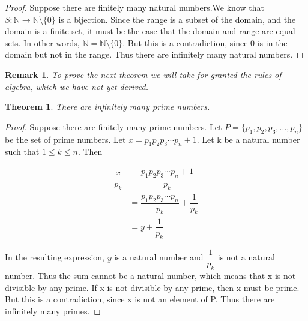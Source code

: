 \documentclass{article}
\newtheorem{theorem}{Theorem}
\newtheorem{remark}{Remark}
\begin{document}
\begin{proof}
Suppose there are finitely many natural numbers.We know that $S : \mathbb{N} \to \mathbb{N}\setminus\{0\}$ is a bijection. Since the range is a subset of the domain, and the domain is a finite set, it must be the case that the domain and range are equal sets. In other words, $\mathbb{N} = \mathbb{N}\setminus\{0\}$. But this is a contradiction, since 0 is in the domain but not in the range. Thus there are infinitely many natural numbers. 
\end{proof}

\begin{remark}
To prove the next theorem we will take for granted the rules of algebra, which we have not yet derived.
\end{remark}

\begin{theorem}
There are infinitely many prime numbers.
\end{theorem}

\begin{proof}
Suppose there are finitely many prime numbers. Let $P = \{p_{1}, p_{2}, p_{3}, ... ,p_{n}\}$ be the set of prime numbers. Let $x = p_{1}p_{2}p_{3} \dotsm p_{n} + 1$. Let k be a natural number such that $1 \leq k \leq n$. Then 

\begin{align*}
\dfrac{x}{p_{k}} &= \dfrac{p_{1}p_{2}p_{3} \dotsm p_{n} + 1}{p_{k}} \\
&= \dfrac{p_{1}p_{2}p_{3} \dotsm p_{n}}{p_{k}} + \dfrac{1}{p_{k}} \\
&= y + \dfrac{1}{p_{k}}
\end{align*}

In the resulting expression, $y$ is a natural number and $\dfrac{1}{p_{k}}$ is not a natural number. Thus the sum cannot be a natural number, which means that x is not divisible by any prime. If x is not divisible by any prime, then x must be prime. But this is a contradiction, since x is not an element of P. Thus there are infinitely many primes. 
\end{proof}
\end{document}

